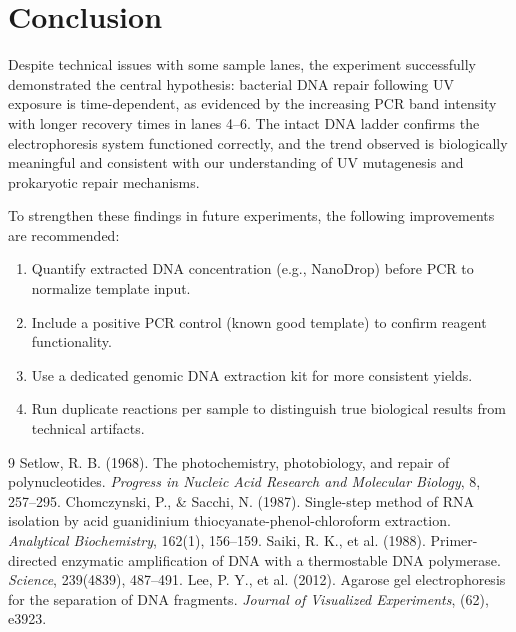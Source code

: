 \documentclass[a4paper]{article}
\begin{document}
\section{Conclusion}
Despite technical issues with some sample lanes, the experiment successfully demonstrated the central hypothesis: bacterial DNA repair following UV exposure is time-dependent, as evidenced by the increasing PCR band intensity with longer recovery times in lanes 4--6. The intact DNA ladder confirms the electrophoresis system functioned correctly, and the trend observed is biologically meaningful and consistent with our understanding of UV mutagenesis and prokaryotic repair mechanisms.

To strengthen these findings in future experiments, the following improvements are recommended:
\begin{enumerate}
    \item Quantify extracted DNA concentration (e.g., NanoDrop) before PCR to normalize template input.
    \item Include a positive PCR control (known good template) to confirm reagent functionality.
    \item Use a dedicated genomic DNA extraction kit for more consistent yields.
    \item Run duplicate reactions per sample to distinguish true biological results from technical artifacts.
\end{enumerate}

\begin{thebibliography}{9}
 Setlow, R. B. (1968). The photochemistry, photobiology, and repair of polynucleotides. \emph{Progress in Nucleic Acid Research and Molecular Biology}, 8, 257--295.
 Chomczynski, P., \& Sacchi, N. (1987). Single-step method of RNA isolation by acid guanidinium thiocyanate-phenol-chloroform extraction. \emph{Analytical Biochemistry}, 162(1), 156--159.
 Saiki, R. K., et al. (1988). Primer-directed enzymatic amplification of DNA with a thermostable DNA polymerase. \emph{Science}, 239(4839), 487--491.
 Lee, P. Y., et al. (2012). Agarose gel electrophoresis for the separation of DNA fragments. \emph{Journal of Visualized Experiments}, (62), e3923.
\end{thebibliography}
\end{document}

